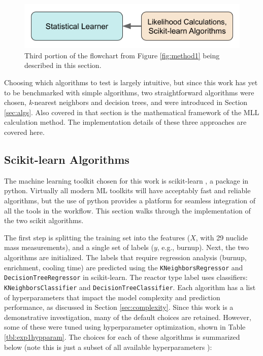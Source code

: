 
\begin{figure}[H]
  \centering
  \includegraphics[width=0.7\linewidth]{./chapters/exp1/methodology1_3.png}
  \caption{Third portion of the flowchart from Figure \ref{fig:method1} being 
           described in this section.}
\end{figure}

Choosing which algorithms to test is largely intuitive, but since this work has
yet to be benchmarked with simple algorithms, two straightforward algorithms
were chosen, \textit{k}-nearest neighbors and decision trees, and were
introduced in Section \ref{sec:algs}. Also covered in that section is the
mathematical framework of the \gls{MLL} calculation method. The implementation
details of these three approaches are covered here. 

\subsection{Scikit-learn Algorithms}

The machine learning toolkit chosen for this work is scikit-learn
\cite{scikit}, a package in python.  Virtually all modern \gls{ML} toolkits
will have acceptably fast and reliable algorithms, but the use of python
provides a platform for seamless integration of all the tools in the workflow.
This section walks through the implementation of the two scikit algorithms. 


The first step is splitting the training set into the features ($X$, with 29
nuclide mass measurements), and a single set of labels ($y$, e.g., burnup).
Next, the two algorithms are initialized.  The labels that require regression
analysis (burnup, enrichment, cooling time) are predicted using the
\texttt{KNeighborsRegressor} and \texttt{DecisionTreeRegressor} in
scikit-learn. The reactor type label uses classifiers:
\texttt{KNeighborsClassifier} and \texttt{DecisionTreeClassifier}.  Each
algorithm has a list of hyperparameters that impact the model complexity and
prediction performance, as discussed in Section \ref{sec:complexity}. Since
this work is a demonstrative investigation, many of the default choices are
retained. However, some of these were tuned using hyperparameter optimization,
shown in Table \ref{tbl:exp1hypparam}.  The choices for each of these
algorithms is summarized below (note this is just a subset of all available
hyperparameters \cite{scikit}):

